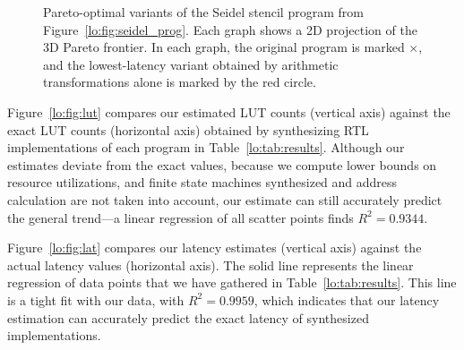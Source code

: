 \begin{figure*}[t]
    \caption{%
        Pareto-optimal variants of the Seidel stencil program from
        Figure~\ref{lo:fig:seidel_prog}. Each graph shows a 2D projection
        of the 3D Pareto frontier. In each graph, the original program is
        marked $\times$, and the lowest-latency variant obtained by arithmetic
        transformations alone is marked by the red circle.}
    \label{lo:fig:seidel}
\end{figure*}

Figure~\ref{lo:fig:lut} compares our estimated LUT counts (vertical axis)
against the exact LUT counts (horizontal axis) obtained by synthesizing RTL
implementations of each program in Table~\ref{lo:tab:results}.  Although our
estimates deviate from the exact values, because we compute lower bounds on
resource utilizations, and finite state machines synthesized and address
calculation are not taken into account, our estimate can still accurately
predict the general trend---a linear regression of all scatter points finds
$R^2 = 0.9344$.

Figure~\ref{lo:fig:lat} compares our latency estimates (vertical axis)
against the actual latency values (horizontal axis). The solid line
represents the linear regression of data points that we have gathered in
Table~\ref{lo:tab:results}. This line is a tight fit with our data, with $R^2 =
0.9959$, which indicates that our latency estimation can accurately predict the
exact latency of synthesized implementations.

